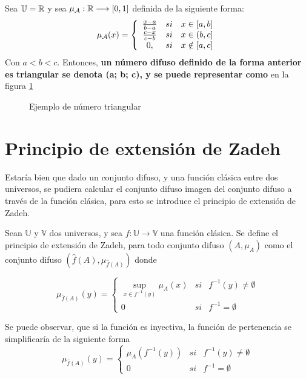   \begin{ejemplo}
    Sea $\mathbb U=\mathbb R$ y sea $\mu_\mathcal{A}: \mathbb R \longrightarrow [0, 1]$ definida de la siguiente forma:
    $$
    \mu_\mathcal{A}(x)=\left\{
    \begin{array}{c c c}
      \frac{x-a}{b-a} & si & x \in [a, b] \\
      \frac{c-x}{c-b} & si & x \in (b, c] \\
	0, & si & x \notin [a, c]
    \end{array}
    \right.
    $$
    Con $a < b < c$. Entonces, \textbf{un número difuso definido de la forma anterior es triangular se denota (a; b; c), y se puede representar como} en la figura \ref{fig:numero_difuso}
    
    \begin{figure}[h]
      \centering
      \caption{Ejemplo de número triangular}
      \label{fig:numero_difuso}
    \end{figure}
    
  \end{ejemplo}


  \section{Principio de extensión de Zadeh}
  Estaría bien que dado un conjunto difuso, y una función clásica entre dos universos, se pudiera calcular el conjunto difuso imagen del conjunto difuso a través de la función clásica, para esto se introduce el principio de extensión de Zadeh.

  \begin{definicion}
  	\label{def:zadeh}
    Sean $\mathbb{U}$ y $\mathbb{V}$ dos universos, y sea $f: \mathbb{U} \longrightarrow \mathbb{V}$ una función clásica. Se define el principio de extensión de Zadeh, para todo conjunto difuso $(A, \mu_A)$ como el conjunto difuso $(\hat{f}(A), \mu_{\hat{f}(A)})$ donde
    
    $$
    \mu_{\hat{f}(A)}(y)=\left\{
    \begin{array}{ccc}
      \sup_{x\in f^{-1}(y)} \mu_A(x) & si & f^{-1}(y)\neq\emptyset\\
      0 & si & f^{-1}=\emptyset
    \end{array}
    \right.
    $$
  \end{definicion}


  Se puede observar, que si la función es inyectiva, la función de pertenencia se simplificaría de la siguiente forma
  $$
  \mu_{\hat{f}(A)}(y)=\left\{
  \begin{array}{ccc}
    \mu_A(f^{-1}(y)) & si & f^{-1}(y)\neq\emptyset\\
    0 & si & f^{-1}=\emptyset
  \end{array}
  \right.
  $$

